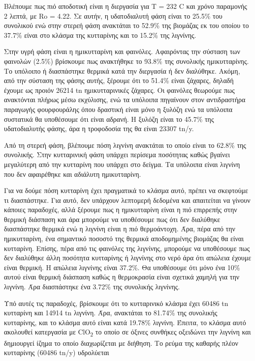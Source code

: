 \documentclass[11pt]{article}
\begin{document}
Βλέπουμε πως πιό αποδοτική είναι η διεργασία για Τ = 232 C και χρόνο παραμονής 2 λεπτά, με Ro = 4.22. Σε αυτήν, η υδατοδιαλυτή φάση είναι το 25.5\% του συνολικού ενώ στην στερεή φάση ανακτάται το 52.9\% της βιομάζας εκ του οποίου το 37.7\% είναι στο κλάσμα της κυτταρίνης και το 15.2\% της λιγνίνης.

Στην υγρή φάση είναι η ημικυτταρίνη και φαινόλες. Αφαιρόντας την σύσταση των φαινολών (2.5\%) βρίσκουμε πως ανακτήθηκε το 93.8\% της συνολικής ημικυτταρίνης. Το υπόλοιπο ή διασπάστηκε θερμικά κατά την διεργασία ή δεν διαλύθηκε. Ακόμη, από την σύσταση της φάσης αυτής, ξέρουμε ότι το 51.4\% είναι ζάχαρες, δηλαδή έχουμε ως προιόν 26214 tn ημικυτταρινικές ζάχαρες. Οι φαινόλες θεωρούμε πως ανακτόνται πλήρως μέσω εκχύλισης, ενώ τα υπόλοιπα πηγαίνουν στον αντιδραστήρα παραγωγής φουρφουράλης όπου δραστική είναι μόνο η ξυλόζη ενώ τα υπόλοιπα συστατικά θα υποθέσουμε ότι είναι αδρανή. Η ξυλόζη είναι το 45.7\% της υδατοδιαλυτής φάσης, άρα η τροφοδοσία της θα είναι 23307 tn/y.

Από τη στερεή φάση, βλέπουμε πόση λιγνίνη ανακτάται το οποίο είναι το 62.8\% της συνολικής. Στην κυτταρινική φάση υπάρχει περίσεμα ποσότητας καθώς βγαίνει μεγαλύτερη από την κυτταρίνη που υπάρχει στο δείγμα. Τα υπόλοιπα είναι λιγνίνη που δεν αφαιρέθηκε και αδιάλυτη ημικυτταρίνη.

Για να δούμε πόση κυτταρίνη έχει πραγματικά το κλάσμα αυτό, πρέπει να σκεφτούμε τι διασπάστηκε. Για αυτό, δεν υπάρχουν λεπτομερή δεδομένα και απαιτείται να γίνουν κάποιες παραδοχές, αλλά ξέρουμε πως η ημικυτταρίνη είναι η πιό επιρρεπής στην θερμική διάσπαση και άρα μπορούμε να υποθέσουμε πως ότι δεν διαλύθηκε διασπάστηκε θερμικά ενώ η λιγνίνη είναι η πιό θερμοάντοχη. Άρα, πέρα από την ημικυτταρίνη, ένα σημαντικό ποσοστό της θερμικά αποδομημένης βιομάζας θα είναι κυτταρίνη. Επίσης, πέρα από τις φαινόλες της λιγνίνης, μπορούμε να υποθέσουμε πως δεν διαλύθηκε άλλη ποσότητα κυτταρίνης ή λιγνίνης στο νερό άρα ότι απώλεια έχουμε είναι θερμική. Η απώλεια λιγνίνης είναι 37.2\%. Θα υποθέσουμε ότι μόνο ένα 10\% αυτού είναι θερμική διάσπαση καθώς η θερμοκρασία είναι σχετικά χαμηλή για την λιγνίνη. Άρα διασπάστηκε ένα 3.72\% της συνολικής λιγνίνης.

Υπό αυτές τις παραδοχές, βρίσκουμε ότι το κυτταρινικό κλάσμα έχει 60486 tn κυτταρίνη και 14914 tn λιγνίνη. Άρα, ανακτάται το 81.74\% της συνολικής κυτταρίνης, και το κλάσμα αυτό είναι κατά 19.78\% λιγνίνη. Έπειτα, το κλάσμα αυτό ακολουθεί κατεργασία με ClO\textsubscript{2} το οποίο σε όξινες συνθήκες οξειδώνει την λιγνίνη και δημιουργεί ίζημα το οποίο διαχωρίζεται με διήθηση. Το ρεύμα της καθαρής πλέον κυτταρίνης (60486 tn/y) υδρολύεται 
\end{document}
